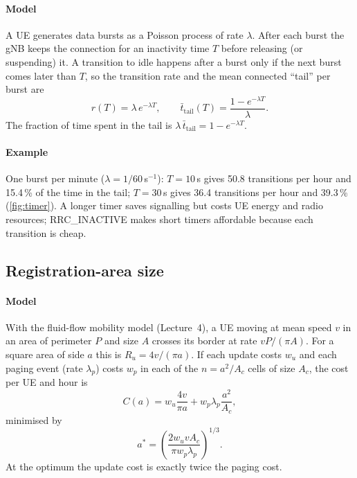 \documentclass[11pt,a4paper]{article}
\begin{document}
\paragraph{Model} A UE generates data bursts as a Poisson process of rate $\lambda$. After each burst the gNB keeps the connection for an inactivity
time $T$ before releasing (or suspending) it. A transition to idle happens after a burst only if the next burst comes later than $T$, so the
transition rate and the mean connected ``tail'' per burst are
\begin{equation}\label{eq:timer}
  r(T) = \lambda\, e^{-\lambda T}, \qquad \bar{t}_{\mathrm{tail}}(T) = \frac{1 - e^{-\lambda T}}{\lambda} .
\end{equation}
The fraction of time spent in the tail is $\lambda\,\bar{t}_{\mathrm{tail}} = 1 - e^{-\lambda T}$.
\paragraph{Example} One burst per minute ($\lambda = 1/60$\,s$^{-1}$): $T = 10$\,s gives 50.8 transitions per hour and 15.4\,\% of the time in the
tail; $T = 30$\,s gives 36.4 transitions per hour and 39.3\,\% (\cref{fig:timer}). A longer timer saves signalling but costs UE energy and radio
resources; RRC\_INACTIVE makes short timers affordable because each transition is cheap.

\begin{acnfigure}
  \caption{Inactivity-timer trade-off for one burst per minute (\cref{eq:timer}).}
  \label{fig:timer}
\end{acnfigure}

\subsection{Registration-area size}\label{sec:ra}
\paragraph{Model} With the fluid-flow mobility model (Lecture~4), a UE moving at mean speed $v$ in an area of perimeter $P$ and size $A$ crosses
its border at rate $vP/(\pi A)$. For a square area of side $a$ this is $R_u = 4v/(\pi a)$. If each update costs $w_u$ and each paging event
(rate $\lambda_p$) costs $w_p$ in each of the $n = a^2/A_c$ cells of size $A_c$, the cost per UE and hour is
\begin{equation}\label{eq:racost}
  C(a) = w_u \frac{4v}{\pi a} + w_p \lambda_p \frac{a^2}{A_c} ,
\end{equation}
minimised by
\begin{equation}\label{eq:raopt}
  a^{*} = \left( \frac{2 w_u v A_c}{\pi w_p \lambda_p} \right)^{1/3} .
\end{equation}
At the optimum the update cost is exactly twice the paging cost.
\end{document}
